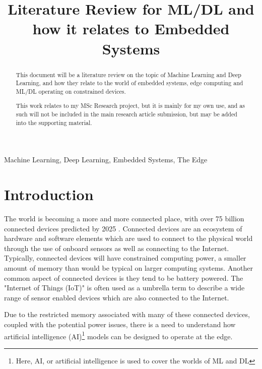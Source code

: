 \documentclass[conference]{IEEEtran}
\begin{document}
\title{Literature Review for ML/DL and how it relates to Embedded Systems\\}

\author{
}

\maketitle

\begin{abstract}
This document will be a literature review on the topic of Machine Learning and Deep Learning, and how they relate to the world of embedded systems, edge computing and ML/DL operating on constrained devices. 

This work relates to my MSc Research project, but it is mainly for my own use, and as such will not be included in the main research article submission, but may be added into the supporting material.
\end{abstract}

\begin{IEEEkeywords}
Machine Learning, Deep Learning, Embedded Systems, The Edge
\end{IEEEkeywords}

\section{Introduction}
The world is becoming a more and more connected place, with over 75 billion connected devices predicted by 2025 \cite{statista1}. Connected devices are an ecosystem of hardware and software elements which are used to connect to the physical world through the use of onboard sensors as well as connecting to the Internet. Typically, connected devices will have constrained computing power, a smaller amount of memory than would be typical on larger computing systems. Another common aspect of connected devices is they tend to be battery powered. The "Internet of Things (IoT)" is often used as a umbrella term to describe a wide range of sensor enabled devices which are also connected to the Internet.

Due to the restricted memory associated with many of these connected devices, coupled with the potential power issues, there is a need to understand how artificial intelligence (AI)\footnote{Here, AI, or artificial intelligence is used to cover the worlds of ML and DL} models can be designed to operate at the edge.
\end{document}
